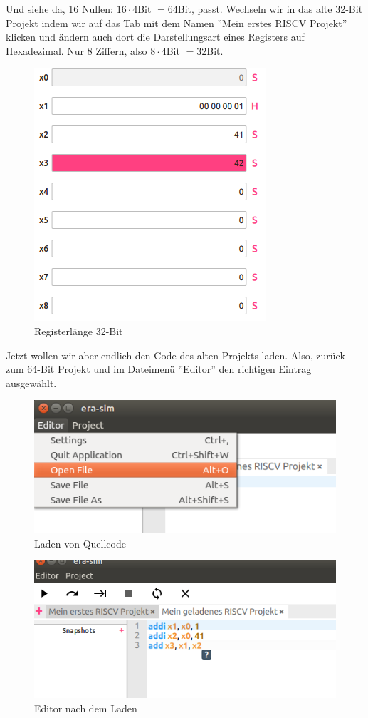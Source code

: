 Und siehe da, 16 Nullen: $16 \cdot 4$Bit $=64$Bit, passt. Wechseln wir in das
alte 32-Bit Projekt indem wir auf das Tab mit dem Namen ''Mein erstes RISCV
Projekt'' klicken und ändern auch dort die Darstellungsart eines Registers auf
Hexadezimal. Nur 8 Ziffern, also $8 \cdot 4$Bit $=32$Bit.
\begin{figure}[H]
	\centering
	\includegraphics[scale=1.0]{Images/first-steps-10.png}
	\caption{Registerlänge 32-Bit}
\end{figure}

Jetzt wollen wir aber endlich den Code des alten Projekts laden. Also, zurück zum
64-Bit Projekt und im Dateimenü ''Editor'' den richtigen Eintrag ausgewählt.
\begin{figure}[H]
	\centering
	\includegraphics[scale=1.0]{Images/first-steps-11.png}
	\caption{Laden von Quellcode}
\end{figure}

\begin{figure}[H]
	\centering
	\includegraphics[scale=1.0]{Images/first-steps-12.png}
	\caption{Editor nach dem Laden}
\end{figure}

